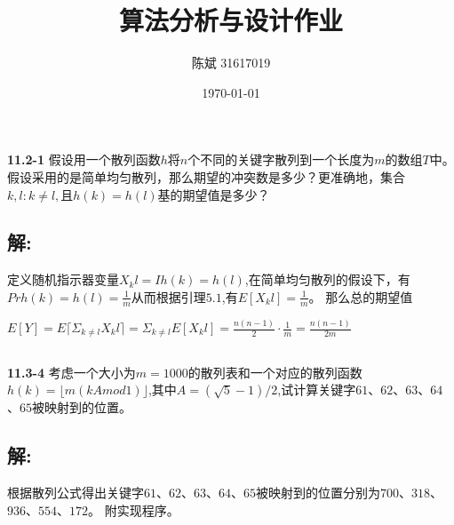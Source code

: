 \documentclass{ctexart}
\title{算法分析与设计作业}
\author{陈斌 31617019}%
\date{\ukdate\today}
\begin{document}
		\maketitle
		\subsection*{}
			\textbf{11.2-1}
			\textnormal{假设用一个散列函数$h$将$n$个不同的关键字散列到一个长度为$m$的数组$T$中。假设采用的是简单均匀散列，那么期望的冲突数是多少？更准确地，集合${{k,l}:k\neq l,且h(k)=h(l)}$基的期望值是多少？}
		\subsection*{解:}
			定义随机指示器变量$X_kl=I{h(k)=h(l)}$,在简单均匀散列的假设下，有$Pr{h(k)=h(l)}=\frac{1}{m}$从而根据引理$5.1$,有$E[X_kl]=\frac{1}{m}$。
			那么总的期望值
			
				$E[Y] = E\lceil\varSigma_{k\neq l}X_kl\rceil
				     = \varSigma_{k\neq l}E[X_kl]
				     = \frac{n(n-1)}{2}\cdot \frac{1}{m}
				     = \frac{n(n-1)}{2m}$

		\subsection*{}
			\textbf{11.3-4}
			\textnormal{考虑一个大小为$m=1000$的散列表和一个对应的散列函数$h(k)=\lfloor m(kA mod 1)\rfloor$,其中$A=(\sqrt{5}-1)/2$,试计算关键字$61$、$62$、$63$、$64$、$65$被映射到的位置。}
		\subsection*{解:}
			根据散列公式得出关键字$61$、$62$、$63$、$64$、$65$被映射到的位置分别为$700$、$318$、$936$、$554$、$172$。
			附实现程序。
	
\end{document}
